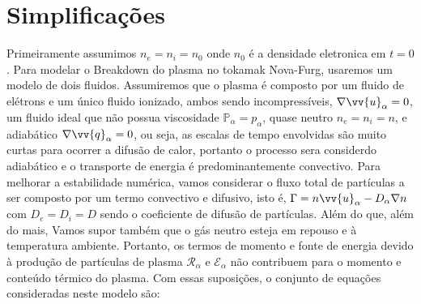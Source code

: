 \documentclass[12pt,oneside,a4paper]{abntex2}
\theoremstyle{definition}  %
\begin{document}
\section{Simplificações}
Primeiramente assumimos $n_e = n_i = n_0$ onde $n_0$ é a densidade eletronica em $t = 0$. Para modelar o Breakdown do plasma no tokamak Nova-Furg, usaremos um modelo de dois fluidos. Assumiremos que o plasma é composto por um fluido de elétrons e um único fluido ionizado, ambos sendo incompressíveis, $\nabla \vv{u}_{\alpha} = 0$,  um fluido ideal que não possua viscosidade $\mathbb{P}_{\alpha} = p_{\alpha}$, quase neutro $n_e = n_i = n$, e adiabático $\nabla \vv{q}_{\alpha} = 0$, ou seja, as escalas de tempo envolvidas são muito curtas para ocorrer a difusão de calor, portanto o processo sera considerdo adiabático e o transporte de energia é predominantemente convectivo. Para melhorar a estabilidade numérica, vamos considerar o fluxo total de partículas a ser composto por um termo convectivo e difusivo, isto é, $\Gamma=n\vv{u}_{\alpha}-D_{\alpha} \nabla n$ com $D_e = D_i = D$ sendo o coeficiente de difusão de partículas. Além do que, além do mais,
Vamos supor também que o gás neutro esteja em repouso e à temperatura ambiente. Portanto, os termos de momento e fonte de energia devido à produção de partículas de plasma $\mathcal{R}_{\alpha}$ e $\mathcal{E}_{\alpha}$ não contribuem para o momento e conteúdo térmico do plasma. Com essas suposições,
o conjunto de equações consideradas neste modelo são:
\end{document}
